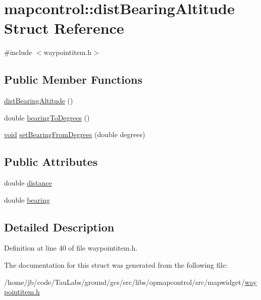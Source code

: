 \hypertarget{structmapcontrol_1_1dist_bearing_altitude}{\section{mapcontrol\-:\-:dist\-Bearing\-Altitude \-Struct \-Reference}
\label{structmapcontrol_1_1dist_bearing_altitude}
}


{\ttfamily \#include $<$waypointitem.\-h$>$}

\subsection*{\-Public \-Member \-Functions}
\begin{DoxyCompactItemize}
\item 
\hyperlink{group___o_p_map_widget_ga0ccea3ba9da45c99f65b815917fe7e31}{dist\-Bearing\-Altitude} ()
\item 
double \hyperlink{group___o_p_map_widget_ga6c6805690915c378c1d294ebf621a7cf}{bearing\-To\-Degrees} ()
\item 
\hyperlink{group___u_a_v_objects_plugin_ga444cf2ff3f0ecbe028adce838d373f5c}{void} \hyperlink{group___o_p_map_widget_gacf717a0d69700f372c04dcee7f550dea}{set\-Bearing\-From\-Degrees} (double degrees)
\end{DoxyCompactItemize}
\subsection*{\-Public \-Attributes}
\begin{DoxyCompactItemize}
\item 
double \hyperlink{group___o_p_map_widget_ga4f3ed7668339c6c63a158fe42d69f8ee}{distance}
\item 
double \hyperlink{group___o_p_map_widget_ga473dc356430fb4d398c78d0fdde33ad1}{bearing}
\end{DoxyCompactItemize}


\subsection{\-Detailed \-Description}


\-Definition at line 40 of file waypointitem.\-h.



\-The documentation for this struct was generated from the following file\-:\begin{DoxyCompactItemize}
\item 
/home/jb/code/\-Tau\-Labs/ground/gcs/src/libs/opmapcontrol/src/mapwidget/\hyperlink{waypointitem_8h}{waypointitem.\-h}\end{DoxyCompactItemize}
